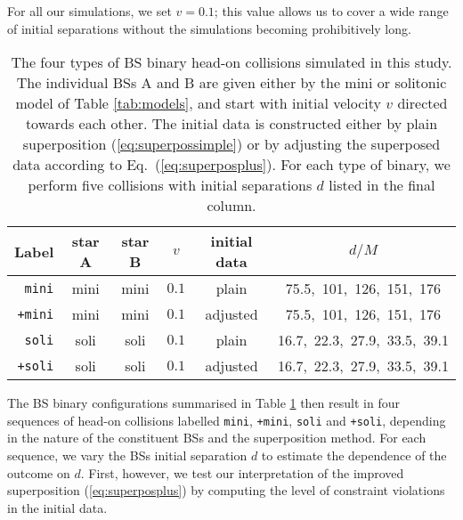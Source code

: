 \documentclass[11pt]{report}  %
\begin{document}
For all our simulations, we
set $v=0.1$; this value
allows us to cover a wide range of initial separations 
without the simulations becoming prohibitively long.
%
\begin{table}[t]
    \centering
    \caption{The four types of BS binary head-on collisions simulated
    in this study. The individual BSs A and B are given either
    by the mini or solitonic model of Table \ref{tab:models},
    and start with initial
    velocity $v$ directed towards each other. The initial data
    is constructed either by plain superposition
    (\ref{eq:superpossimple}) or by adjusting
    the superposed data according to Eq.~(\ref{eq:superposplus}).
    For each type of binary, we perform five collisions with
    initial separations $d$ listed in the final column.
    }
    \begin{tabular}{r|ccccc}
    \hline
    Label & star A & star B & $v$ & initial data & $d/M$ \\
    \hline
    {\tt mini} & mini & mini & $0.1$ & plain &
    75.5,~101,~126,~151,~176 \\
    {\tt +mini}& mini & mini & $0.1$ & adjusted &
    75.5,~101,~126,~151,~176 \\
    {\tt soli} & soli & soli & $0.1$ & plain &
    16.7,~22.3,~27.9,~33.5,~39.1 \\
    {\tt +soli} & soli & soli & $0.1$ &
    adjusted &
    16.7,~22.3,~27.9,~33.5,~39.1 \\
    \hline
    \end{tabular}
    \label{tab:hods}
\end{table}
%
The BS binary configurations
summarised in Table \ref{tab:hods} then result
in four sequences of head-on collisions labelled
{\tt mini}, {\tt +mini}, {\tt soli} and {\tt +soli},
depending in the nature of the constituent BSs and
the superposition method. For each sequence, we vary the
BSs initial separation $d$ to estimate the dependence of the
outcome on $d$. First, however, we test our interpretation
of the improved superposition (\ref{eq:superposplus})
by computing the level of constraint violations in the
initial data.
\end{document}
